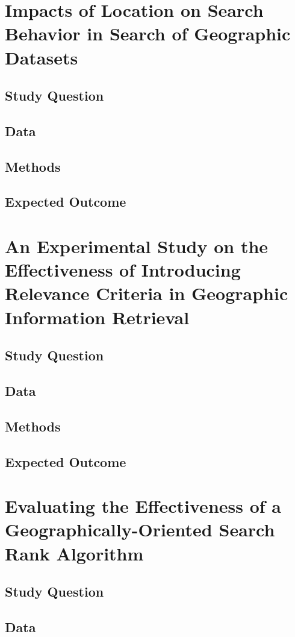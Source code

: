 \section{Impacts of Location on Search Behavior in Search of Geographic  Datasets}
\subsection{Study Question}
\subsection{Data}
\subsection{Methods}
\subsection{Expected Outcome}

\section{An Experimental Study on the Effectiveness of Introducing Relevance Criteria in Geographic Information Retrieval}
\subsection{Study Question}
\subsection{Data}
\subsection{Methods}
\subsection{Expected Outcome}

\section{Evaluating the Effectiveness of a Geographically-Oriented Search Rank Algorithm}
\subsection{Study Question}
\subsection{Data}
